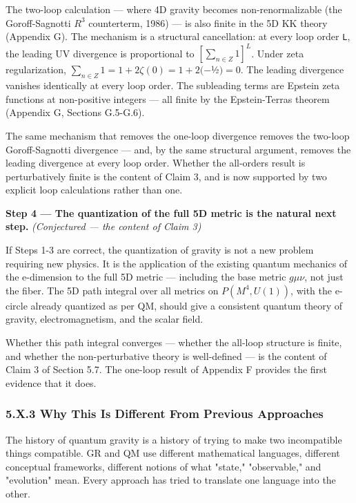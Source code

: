 \documentclass[aps,prd,preprint,superscriptaddress,longbibliography,floatfix]{revtex4-2}
\theoremstyle{remark}
\begin{document}
The two-loop calculation --- where 4D gravity becomes non-renormalizable (the Goroff-Sagnotti $R^{3}$ counterterm, 1986) --- is also finite in the 5D KK theory (Appendix G). The mechanism is a structural cancellation: at every loop order \texttt{L}, the leading UV divergence is proportional to $[\sum_{n\in Z} 1]^L$. Under zeta regularization, $\sum_{n\in Z} 1 = 1 + 2\zeta(0) = 1 + 2(-$½$) = 0$. The leading divergence vanishes identically at every loop order. The subleading terms are Epstein zeta functions at non-positive integers --- all finite by the Epstein-Terras theorem (Appendix G, Sections G.5-G.6).

The same mechanism that removes the one-loop divergence removes the two-loop Goroff-Sagnotti divergence --- and, by the same structural argument, removes the leading divergence at every loop order. Whether the all-orders result is perturbatively finite is the content of Claim 3, and is now supported by two explicit loop calculations rather than one.

\textbf{Step 4 --- The quantization of the full 5D metric is the natural next step.} \textit{(Conjectured --- the content of Claim 3)}

If Steps 1-3 are correct, the quantization of gravity is not a new problem requiring new physics. It is the application of the existing quantum mechanics of the e-dimension to the full 5D metric --- including the base metric $g\mu\nu$, not just the fiber. The 5D path integral over all metrics on $P(M^{4}, U(1))$, with the e-circle already quantized as per QM, should give a consistent quantum theory of gravity, electromagnetism, and the scalar field.

Whether this path integral converges --- whether the all-loop structure is finite, and whether the non-perturbative theory is well-defined --- is the content of Claim 3 of Section 5.7. The one-loop result of Appendix F provides the first evidence that it does.



\subsubsection{5.X.3 Why This Is Different From Previous Approaches}

The history of quantum gravity is a history of trying to make two incompatible things compatible. GR and QM use different mathematical languages, different conceptual frameworks, different notions of what "state," "observable," and "evolution" mean. Every approach has tried to translate one language into the other.
\end{document}
